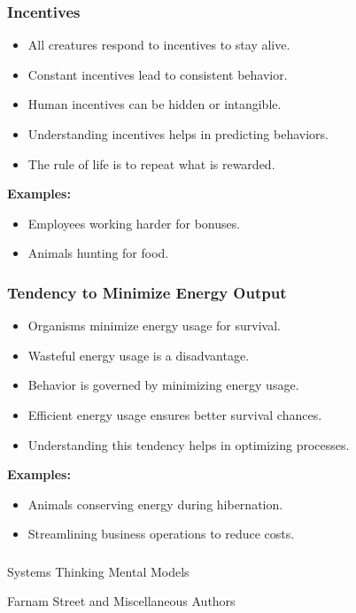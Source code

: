 \begin{frame}[fragile]\frametitle{Incentives}
\begin{itemize}
    \item All creatures respond to incentives to stay alive.
    \item Constant incentives lead to consistent behavior.
    \item Human incentives can be hidden or intangible.
    \item Understanding incentives helps in predicting behaviors.
    \item The rule of life is to repeat what is rewarded.
\end{itemize}
\textbf{Examples:}
\begin{itemize}
    \item Employees working harder for bonuses.
    \item Animals hunting for food.
\end{itemize}
\end{frame}

\begin{frame}[fragile]\frametitle{Tendency to Minimize Energy Output}
\begin{itemize}
    \item Organisms minimize energy usage for survival.
    \item Wasteful energy usage is a disadvantage.
    \item Behavior is governed by minimizing energy usage.
    \item Efficient energy usage ensures better survival chances.
    \item Understanding this tendency helps in optimizing processes.
\end{itemize}
\textbf{Examples:}
\begin{itemize}
    \item Animals conserving energy during hibernation.
    \item Streamlining business operations to reduce costs.
\end{itemize}
\end{frame}

\begin{frame}[fragile]\frametitle{}
\begin{center}
{\Large Systems Thinking Mental Models}

{\tiny Farnam Street and Miscellaneous Authors }


\end{center}
\end{frame}

